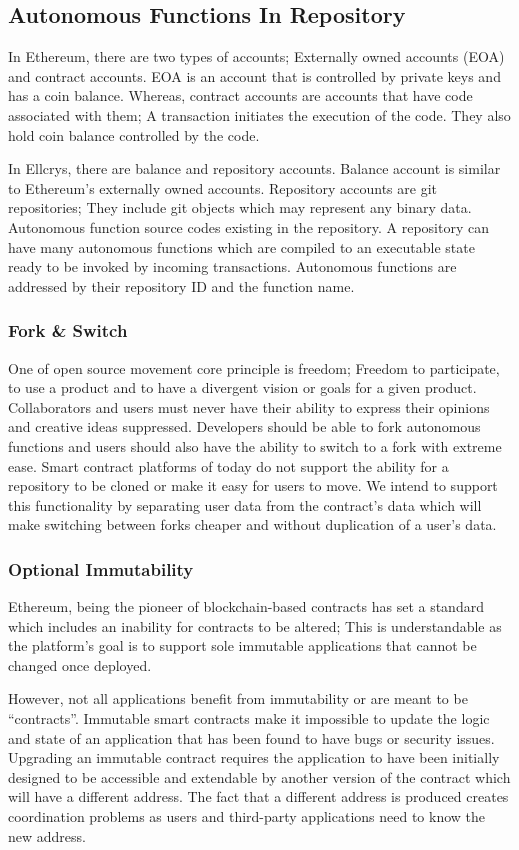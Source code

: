 \subsection{Autonomous Functions In Repository}
In Ethereum, there are two types of accounts; Externally owned accounts (EOA) and contract accounts. EOA is an account that is controlled by private keys and has a coin balance. Whereas, contract accounts are accounts that have code associated with them; A transaction initiates the execution of the code. They also hold coin balance controlled by the code.

In Ellcrys, there are balance and repository accounts. Balance account is similar to Ethereum’s externally owned accounts. Repository accounts are git repositories; They include git objects which may represent any binary data. Autonomous function source codes existing in the repository. A repository can have many autonomous functions which are compiled to an executable state ready to be invoked by incoming transactions. Autonomous functions are addressed by their repository ID and the function name.

\subsubsection{Fork & Switch}
One of open source movement core principle is freedom; Freedom to participate, to use a product and to have a divergent vision or goals for a given product. Collaborators and users must never have their ability to express their opinions and creative ideas suppressed. Developers should be able to fork autonomous functions and users should also have the ability to switch to a fork with extreme ease. Smart contract platforms of today do not support the ability for a repository to be cloned or make it easy for users to move. We intend to support this functionality by separating user data from the contract’s data which will make switching between forks cheaper and without duplication of a user’s data.


\subsubsection{Optional Immutability}
Ethereum, being the pioneer of blockchain-based contracts has set a standard which includes an inability for contracts to be altered; This is understandable as the platform’s goal is to support sole immutable applications that cannot be changed once deployed.

However, not all applications benefit from immutability or are meant to be “contracts”. Immutable smart contracts make it impossible to update the logic and state of an application that has been found to have bugs or security issues. Upgrading an immutable contract requires the application to have been initially designed to be accessible and extendable by another version of the contract which will have a different address. The fact that a different address is produced creates coordination problems as users and third-party applications need to know the new address.

